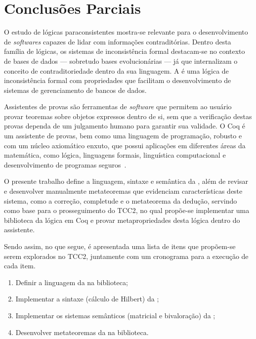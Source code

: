 \chapter{Conclusões Parciais}\label{chap:conclusao}

O estudo de lógicas paraconsistentes mostra-se relevante para o desenvolvimento de \textit{softwares} capazes de lidar com informações contraditórias. Dentro desta família de lógicas, os sistemas de inconsistência formal destacam-se no contexto de bases de dados {---} sobretudo bases evolucionárias {---} já que internalizam o conceito de contraditoriedade dentro da sua linguagem. A \lfium{} é uma lógica de inconsistência formal com propriedades que facilitam o desenvolvimento de sistemas de gerenciamento de bancos de dados. 

Assistentes de provas são ferramentas de \textit{software} que permitem ao usuário provar teoremas sobre objetos expressos dentro de si, sem que a verificação destas provas dependa de um julgamento humano para garantir sua validade. O Coq é um assistente de provas, bem como uma linguagem de programação, robusto e com um núcleo axiomático enxuto, que possui aplicações em diferentes áreas da matemática, como lógica, linguagens formais, linguística computacional e desenvolvimento de programas seguros~\cite{coqart}.

O presente trabalho define a linguagem, sintaxe e semântica da \lfium{}, além de revisar e desenvolver manualmente metateoremas que evidenciam características deste sistema, como a correção, completude e o metateorema da dedução, servindo como base para o prosseguimento do TCC2, no qual propõe-se implementar uma biblioteca da lógica \lfium{} em Coq e provar metapropriedades desta lógica dentro do assistente.

Sendo assim, no que segue, é apresentada uma lista de itens que propõem-se serem explorados no TCC2, juntamente com um cronograma para a execução de cada item.

\begin{enumerate}
    \item Definir a linguagem da \lfium{} na biblioteca;
    \item Implementar a sintaxe (cálculo de Hilbert) da \lfium{};
    \item Implementar os sistemas semânticos (matricial e bivaloração) da \lfium{};
    \item Desenvolver metateoremas da \lfium{} na biblioteca.
\end{enumerate}

